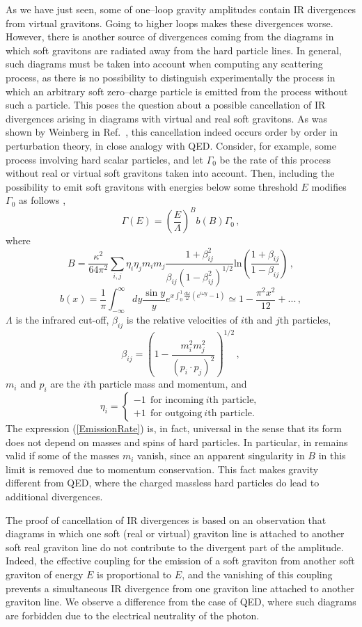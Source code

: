 \documentclass[11pt,a4paper]{article}
\newcommand{\be}{\begin{equation}}
\newcommand{\ee}{\end{equation}}
\newcommand\G{\Gamma}
\renewcommand\b{\beta}
\begin{document}
As we have just seen, some of one--loop gravity amplitudes contain IR divergences from virtual gravitons. Going to higher loops makes these divergences worse. However, there is another source of divergences coming from the diagrams in which soft gravitons are radiated away from the hard particle lines. In general, such diagrams must be taken into account when computing any scattering process, as there is no possibility to distinguish experimentally the process in which an arbitrary soft zero--charge particle is emitted from the process without such a particle.
This poses the question about a possible cancellation of IR divergences arising in diagrams with virtual and real soft gravitons. As was shown by Weinberg in Ref.~\cite{Weinberg:1965nx}, this cancellation indeed occurs order by order in perturbation theory, in close analogy with QED. Consider, for example, some process involving hard scalar particles, and let
$\G_0$ be the rate of this process without real or virtual soft gravitons taken into account. Then, including the possibility to emit soft gravitons with energies below some threshold $E$ modifies $\G_0$ as follows \cite{Weinberg:1965nx},
\be\label{EmissionRate}
\G(E)=\left(\dfrac{E}{\Lambda}\right)^Bb(B)\G_0\,,
\ee
where
\be
B=\dfrac{\kappa^2}{64\pi^2}\sum_{i,j}\eta_i\eta_jm_im_j\dfrac{1+\b^2_{ij}}{\b_{ij}(1-\b_{ij}^2)^{1/2}}\text{ln}\left(\dfrac{1+\b_{ij}}{1-\b_{ij}}\right)\,,
\ee
\be
b(x)=\dfrac{1}{\pi}\int_{-\infty}^\infty dy\dfrac{\sin y}{y}e^{x\int_0^1\frac{d\omega}{\omega}(e^{i\omega y}-1)}\simeq 1-\dfrac{\pi^2x^2}{12}+...\,,
\ee
$\Lambda$ is the infrared cut-off, $\b_{ij}$ is the relative velocities of $i$th and $j$th particles,
\be
\b_{ij}=\left(1-\frac{m_i^2m_j^2}{(p_i\cdot p_j)^2}\right)^{1/2}\,,
\ee
$m_i$ and $p_i$ are the $i$th particle mass and momentum, and
\be\label{DefEta}
\eta_i=\left\lbrace\begin{array}{l}
-1~~\text{for incoming}~ i\text{th particle},\\
+1~~\text{for outgoing}~ i\text{th particle}.
\end{array}\right.
\ee
The expression (\ref{EmissionRate}) is, in fact, universal in the sense that its form does not depend on masses and spins of hard particles. In particular, in remains valid if some of the masses $m_i$ vanish, since an apparent singularity in $B$ in this limit is removed due to momentum conservation. This fact makes gravity different from QED, where the charged massless hard particles do lead to additional divergences.

The proof of cancellation of IR divergences is based on an observation that diagrams in which one soft (real or virtual) graviton line is attached to another soft real graviton line do not contribute to the divergent part of the amplitude. Indeed, the effective coupling for the emission of a soft graviton from another soft graviton of energy $E$ is proportional to $E$, and the vanishing of this coupling prevents a simultaneous IR divergence from one graviton line attached to another graviton line.
We observe a difference from the case of QED, where such diagrams are forbidden due to the electrical neutrality of the photon.
\end{document}
